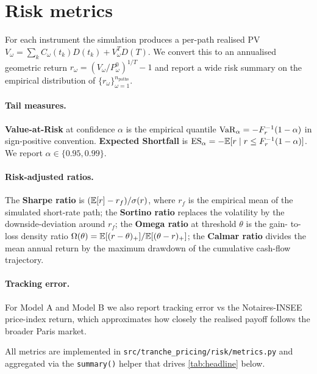 \section{Risk metrics}\label{sec:risk}

For each instrument the simulation produces a per-path realised PV
$V_\omega = \sum_k C_\omega(t_k) D(t_k) + V_\omega^T D(T)$. We convert this
to an annualised geometric return $r_\omega = (V_\omega / P_\omega^0)^{1/T}
- 1$ and report a wide risk summary on the empirical distribution of
$\{r_\omega\}_{\omega = 1}^{n_{\text{paths}}}$.

\paragraph{Tail measures.}
\textbf{Value-at-Risk} at confidence $\alpha$ is the empirical quantile
$\operatorname{VaR}_\alpha = -F^{-1}_r(1 - \alpha)$ in sign-positive convention.
\textbf{Expected Shortfall} \autocite{AcerbiTasche2002} is
$\operatorname{ES}_\alpha = -\mathbb{E}[r \mid r \le F^{-1}_r(1 - \alpha)]$. We report
$\alpha \in \{0.95, 0.99\}$.

\paragraph{Risk-adjusted ratios.}
The \textbf{Sharpe ratio} is $(\mathbb{E}[r] - r_f) / \sigma(r)$, where $r_f$ is
the empirical mean of the simulated short-rate path; the
\textbf{Sortino ratio} replaces the volatility by the downside-deviation
around $r_f$; the \textbf{Omega ratio} at threshold $\theta$ is the gain-
to-loss density ratio
$\Omega(\theta) = \mathbb{E}[(r - \theta)_+] / \mathbb{E}[(\theta - r)_+]$; the
\textbf{Calmar ratio} divides the mean annual return by the maximum
drawdown of the cumulative cash-flow trajectory.

\paragraph{Tracking error.}
For Model A and Model B we also report tracking error vs the Notaires-INSEE
price-index return, which approximates how closely the realised payoff
follows the broader Paris market.

All metrics are implemented in
\texttt{src/tranche\_pricing/risk/metrics.py} and aggregated via the
\texttt{summary()} helper that drives \cref{tab:headline} below.

